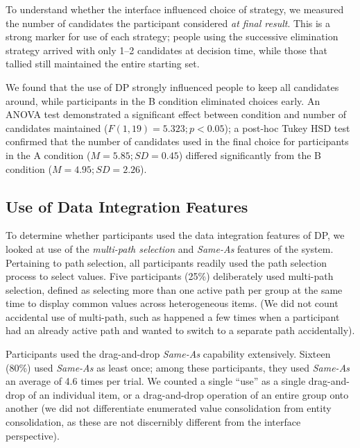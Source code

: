 \documentclass{sigchi}
\begin{document}
To understand whether the interface influenced choice of strategy, we measured the number of candidates the participant considered \emph{at final result}.  This is a strong marker for use of each strategy; people using the successive elimination strategy arrived with only 1--2 candidates at decision time, while those that tallied still maintained the entire starting set.

We found that the use of DP strongly influenced people to keep all candidates around, while participants in the B condition eliminated choices early.  An ANOVA test demonstrated a significant effect between condition and number of candidates maintained ($F(1,19)=5.323; p<0.05$); a post-hoc Tukey HSD test confirmed that the number of candidates used in the final choice for participants in the A condition ($M=5.85;SD=0.45$) differed significantly from the B condition ($M=4.95; SD=2.26$).

\subsection{Use of Data Integration Features}

To determine whether participants used the data integration features of DP, we looked at use of the \emph{multi-path selection} and \emph{Same-As} features of the system.   Pertaining to path selection, all participants readily used the path selection process to select values.   Five participants (25\%) deliberately used multi-path selection, defined as selecting more than one active path per group at the same time to display common values across heterogeneous items. (We did not count accidental use of multi-path, such as happened a few times when a participant had an already active path and wanted to switch to a separate path accidentally).

Participants used the drag-and-drop \emph{Same-As} capability extensively. Sixteen (80\%) used \emph{Same-As} as least once; among these participants, they used \emph{Same-As} an average of 4.6 times per trial. We counted a single ``use'' as a single drag-and-drop of an individual item, or a drag-and-drop operation of an entire group onto another (we did not differentiate enumerated value consolidation from entity consolidation, as these are not discernibly different from the interface perspective).

\end{document}
